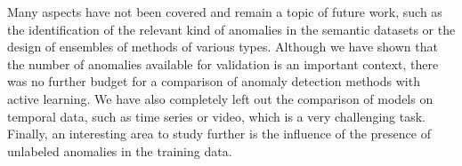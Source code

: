 Many aspects have not been covered and remain a topic of future work, such as the identification of the relevant kind of anomalies in the semantic datasets or the design of ensembles of methods of various types. Although we have shown that the number of anomalies available for validation is an important context, there was no further budget for a comparison of anomaly detection methods with active learning.  We have also completely left out the comparison of models on temporal data, such as time series or video, which is a very challenging task. Finally, an interesting area to study further is the influence of the presence of unlabeled anomalies in the training data.
